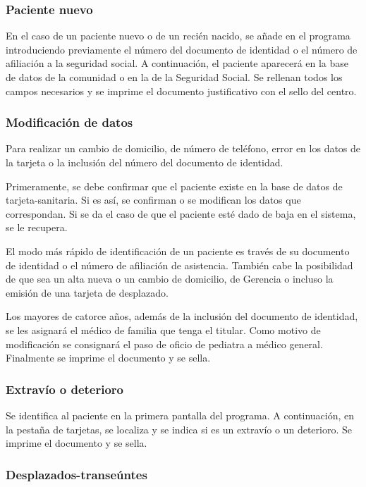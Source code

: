 \subsubsection{Paciente nuevo}

En el caso de un paciente nuevo o de un recién nacido, se añade en el programa introduciendo previamente el número del documento de identidad o el número de afiliación a la seguridad social.
A continuación, el paciente aparecerá en la base de datos de la comunidad o en la de la Seguridad Social.
Se rellenan todos los campos necesarios y se imprime el documento justificativo con el sello del centro.

\subsubsection{Modificación de datos}

Para realizar un cambio de domicilio, de número de teléfono, error en los datos de la tarjeta o la inclusión del número del documento de identidad.

Primeramente, se debe confirmar que el paciente existe en la base de datos de \Gls{tarjeta-sanitaria}.
Si es así, se confirman o se modifican los datos que correspondan.
Si se da el caso de que el paciente esté dado de baja en el sistema, se le recupera.

El modo más rápido de identificación de un paciente es través de su documento de identidad o el número de afiliación de asistencia.
También cabe la posibilidad de que sea un alta nueva o un cambio de domicilio, de Gerencia o incluso la emisión de una tarjeta de desplazado.

Los mayores de catorce años, además de la inclusión del documento de identidad, se les asignará el médico de familia que tenga el titular.
Como motivo de modificación se consignará el paso de oficio de pediatra a médico general.
Finalmente se imprime el documento y se sella.

\subsubsection{Extravío o deterioro}

Se identifica al paciente en la primera pantalla del programa.
A continuación, en la pestaña de tarjetas, se localiza y se indica si es un extravío o un deterioro.
Se imprime el documento y se sella.

\subsubsection{Desplazados-transeúntes}

